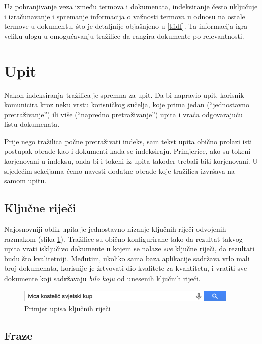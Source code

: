 \documentclass[a4paper,twoside,12pt]{scrreprt}
\begin{document}
Uz pohranjivanje veza između termova i dokumenata, indeksiranje često uključuje i izračunavanje i spremanje informacija o važnosti termova u odnosu na ostale termove u dokumentu, što je detaljnije objašnjeno u \ref{tfidf}. Ta informacija igra veliku ulogu u omogućavanju tražilice da rangira dokumente po relevantnosti.

\section{Upit}

Nakon indeksiranja tražilica je spremna za upit. Da bi napravio upit, korisnik komunicira kroz neku vrstu korisničkog sučelja, koje prima jedan (``jednostavno pretraživanje'') ili više (``napredno pretraživanje'') upita i vraća odgovarajuću listu dokumenata.

Prije nego tražilica počne pretraživati indeks, sam tekst upita obično prolazi isti postupak obrade kao i dokumenti kada se indeksiraju. Primjerice, ako su tokeni korjenovani u indeksu, onda bi i tokeni iz upita također trebali biti korjenovani. U sljedećim sekcijama ćemo navesti dodatne obrade koje tražilica izvršava na samom upitu.

\subsection{Ključne riječi}

Najosnovniji oblik upita je jednostavno nizanje ključnih riječi odvojenih razmakom (slika \ref{keywords}). Tražilice su obično konfigurirane tako da rezultat takvog upita vrati isključivo dokumente u kojem se nalaze \textit{sve} ključne riječi, da rezultati budu što kvalitetniji. Međutim, ukoliko sama baza aplikacije sadržava vrlo mali broj dokumenata, korisnije je žrtvovati dio kvalitete za kvantitetu, i vratiti sve dokumente koji sadržavaju \textit{bilo koju} od unesenih ključnih riječi.

\begin{figure}[H]
  \centering
  \includegraphics[width=300pt]{keywords}
  \caption{Primjer upisa ključnih riječi}
  \label{keywords}
\end{figure}

\subsection{Fraze}
\end{document}
